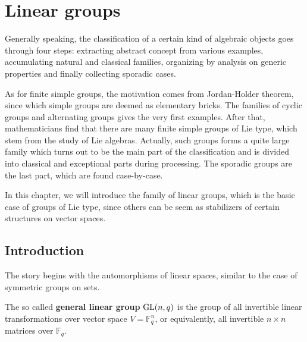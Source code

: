 \documentclass[a4paper,11pt]{article}
\def\maintitle#1{\section*{#1}}
\def\subtitle#1{\section{#1}}
\begin{document}
\else %
    \ifx\chaptitle\undefined %
        \def\maintitle#1{\subsection{#1}}
        \def\subtitle#1{\subsubsection{#1}}
    \else %
        \def\maintitle#1{\section{#1}}
        \def\subtitle#1{\subsection{#1}}
    \fi
\fi

\maintitle{Linear groups}

Generally speaking, the classification of a certain kind of algebraic objects goes through four steps: extracting abstract concept from various examples, accumulating natural and classical families, organizing by analysis on generic properties and finally collecting sporadic cases. 

As for finite simple groups, the motivation comes from Jordan-Holder theorem, since which simple groups are deemed as elementary bricks. The families of cyclic groups and alternating groups gives the very first examples. After that, mathematicians find that there are many finite simple groups of Lie type, which stem from the study of Lie algebras. Actually, such groups forms a quite large family which turns out to be the main part of the classification and is divided into classical and exceptional parts during processing. The sporadic groups are the last part, which are found case-by-case.

In this chapter, we will introduce the family of linear groups, which is the basic case of groups of Lie type, since others can be seem as stabilizers of certain structures on vector spaces.

\subtitle{Introduction}


The story begins with the automorphisms of linear spaces, similar to the case of symmetric groups on sets.
\begin{definition}
    The so called \textbf{general linear group} $\mathrm{GL}(n,q)$ is the group of  all invertible linear transformations over vector space $V=\mathbb{F}_q^n$, or equivalently, all invertible $n\times n$ matrices over $\mathbb{F}_q$.
\end{definition}
\end{document}
